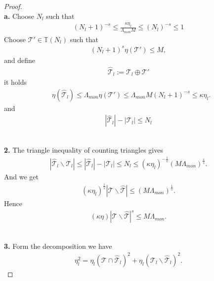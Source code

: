 \documentclass[a4paper,12pt,oneside,fleqn]{book}
\theoremstyle{definition}
\theoremstyle{remark}
\begin{document}
\begin{proof}
\quad\\
\textbf{a.} 
 Choose $N_l$ such that
\begin{align*}
	(N_l + 1)^{-s}  \le \frac{\kappa \eta_l}{\Lambda_{mon} M} \le (N_l)^{-s} \le  1
\end{align*}
Choose $\mathcal{T}' \in \mathbb{T}(N_l)$ such that
\begin{align*}
	(N_l + 1)^s \eta(\mathcal{T}')\le M,
\end{align*}
and define
\begin{align*}
	\hat{\mathcal{T}}_l:= \mathcal{T}_l \oplus \mathcal{T}'
\end{align*}
it holds
\begin{align*}
	&\eta(\hat{\mathcal{T}}_l) \le \Lambda_{mon} \eta(\mathcal{T}') 
	\le \Lambda_{mon} M (N_l + 1)^{-s} \le \kappa \eta_l.
\end{align*}
and 
\begin{align*}
	|\hat{\mathcal{T}}_l| - |\mathcal{T}_l| \le N_l
\end{align*}

\quad\\
\textbf{2.} The triangle inequality of counting triangles gives
\begin{align*}
	|\hat{\mathcal{T}}_l \backslash \mathcal{T}_l| \le  |\hat{\mathcal{T}}_l| - |\mathcal{T}_l|  \le N_l \le (\kappa \eta_l)^{-\frac{1}{s}} (M \Lambda_{mon})^{\frac{1}{s}}.
\end{align*}
And we get
\begin{align*}
	(\kappa\eta_l)^{\frac{1}{s}} |\mathcal{T} \backslash \hat{\mathcal{T}}| \le (M \Lambda_{mon})^{\frac{1}{s}}.
\end{align*}
Hence
\begin{align*}
	(\kappa\eta)|\mathcal{T} \backslash \hat{\mathcal{T}}|^s \le M\Lambda_{mon}.
\end{align*}

\quad\\
\textbf{3.} Form the decomposition we have
\begin{align*}
	\eta_l^2 = \eta_l(\mathcal{T} \cap \hat{\mathcal{T}}_l)^2 + \eta_l(\mathcal{T}_l \backslash \hat{\mathcal{T}}_l)^2. 
\end{align*}

\end{proof}
\end{document}
